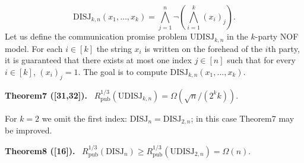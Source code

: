 \documentclass[10pt,a4paper]{article}
\newenvironment{authorclaim}[1]{\par\medskip\noindent\textbf{#1.}\ \ignorespaces}{\par\medskip}
\begin{document}
\[\mathrm{DISJ}_{k,n}(x_1,\ldots,x_k)=\bigwedge_{j=1}^n\neg\left(\bigwedge_{i=1}^k(x_i)_j\right).\]
Let us define the communication promise problem $\mathrm{UDISJ}_{k,n}$ in the $k$-party NOF model. For each $i\in[k]$ the string $x_i$ is written on the forehead of the $i$th party, it is guaranteed that there exists at most one index $j\in[n]$ such that for every $i\in[k]$, $(x_i)_j=1$. The goal is to compute $\mathrm{DISJ}_{k,n}(x_1,\ldots,x_k)$.
\begin{authorclaim}{Theorem7 ([31,32])}
$R^{1/3}_{\mathrm{pub}}(\mathrm{UDISJ}_{k,n})=\Omega(\sqrt n/(2^kk))$.
\end{authorclaim}
For $k=2$ we omit the first index: $\mathrm{DISJ}_n=\mathrm{DISJ}_{2,n}$; in this case Theorem7 may be improved.
\begin{authorclaim}{Theorem8 ([16])}
$R^{1/3}_{\mathrm{pub}}(\mathrm{DISJ}_n)\ge R^{1/3}_{\mathrm{pub}}(\mathrm{UDISJ}_{2,n})=\Omega(n)$.
\end{authorclaim}
\end{document}
